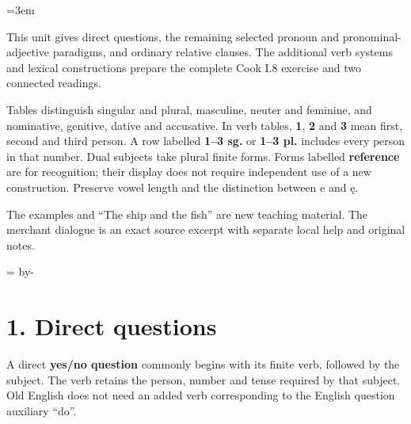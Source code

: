\BookRecto
\begingroup
\renewcommand{\runningtitle}{Unit 8. Questions and relatives}
\emergencystretch=3em
\newcommand{\itempara}[2]{\par\addvspace{3pt}\noindent\hangindent=1.8em\hangafter=1\makebox[1.8em][l]{#1.}#2\par}
\newcommand{\reserve}[1]{\par\penalty-100\begingroup\dimen0=\pagegoal\advance\dimen0 by-\pagetotal\ifdim\dimen0<#1\newpage\fi\endgroup}

\raggedright
{}

This unit gives direct questions, the remaining selected pronoun and pronominal-adjective paradigms, and ordinary relative clauses. The additional verb systems and lexical constructions prepare the complete Cook I.8 exercise and two connected readings.

Tables distinguish singular and plural, masculine, neuter and feminine, and nominative, genitive, dative and accusative. In verb tables, \textbf{1}, \textbf{2} and \textbf{3} mean first, second and third person. A row labelled \textbf{1–3 sg.} or \textbf{1–3 pl.} includes every person in that number. Dual subjects take plural finite forms. Forms labelled \textbf{reference} are for recognition; their display does not require independent use of a new construction. Preserve vowel length and the distinction between e and ę.

The examples and “The ship and the fish” are new teaching material. The merchant dialogue is an exact source excerpt with separate local help and original notes.

\reserve{7\baselineskip}
\section*{1. Direct questions}

A direct \textbf{yes/\allowbreak{}no question} commonly begins with its finite verb, followed by the subject. The verb retains the person, number and tense required by that subject. Old English does not need an added verb corresponding to the English question auxiliary “do”.

